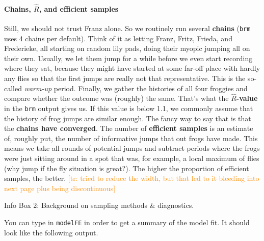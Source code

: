 \documentclass[nobib]{tufte-handout}
\newcommand{\tr}[1]{\textcolor{DarkOrange}{[tr: #1]}}
\begin{document}
\begin{InfoBox}[]
{\begin{minipage}{1\textwidth}
\paragraph{Chains, $\hat{R}$, and efficient samples}      
    Still, we should not trust Franz alone. So we routinely run several
    \textbf{chains} (\texttt{brm} uses 4 chains per default). Think of it as letting Franz,
    Fritz, Frieda, and Frederieke, all starting on random lily pads, doing their myopic jumping
    all on their own. Usually, we let them jump for a while before we even start recording
    where they sat, because they might have started at some far-off place with hardly any flies so that the first jumps are really not that representative. This is the so-called
    \emph{warm-up} period. Finally, we gather the histories of all four froggies and compare
    whether the outcome was (roughly) the same. That's what the \textbf{$\hat{R}$-value} in the
    \texttt{brm} output gives us. If this value is below 1.1, we commonly assume that the
    history of frog jumps are similar enough. The fancy way to say that is that the \textbf{chains have
      converged}. The number of \textbf{efficient samples} is an estimate of, roughly put, the
    number of informative jumps that out frogs have made. This means we take all rounds of potential jumps and subtract periods where the frogs
    were just sitting around in a spot that was, for example, a local maximum of flies (why jump if the fly situation is great?). The
    higher the proportion of efficient samples, the better.
    \tr{tried to reduce the width, but that led to it bleeding into next page plus being discontinuous}
    
  \end{minipage} \par
  } \par
  \begin{center}
    Info Box 2: Background on sampling methods \& diagnostics.
  \end{center}
\end{InfoBox}


You can type in \texttt{modelFE} in order to get a summary of the model fit. It should look like the following output.

\bigskip
\end{document}
